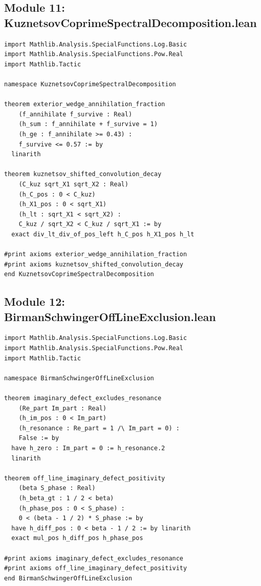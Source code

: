 \documentclass[11pt,a4paper]{article}
\begin{document}
\subsection{Module 11: KuznetsovCoprimeSpectralDecomposition.lean}
\begin{lstlisting}[language=Lean4]
import Mathlib.Analysis.SpecialFunctions.Log.Basic
import Mathlib.Analysis.SpecialFunctions.Pow.Real
import Mathlib.Tactic

namespace KuznetsovCoprimeSpectralDecomposition

theorem exterior_wedge_annihilation_fraction
    (f_annihilate f_survive : Real)
    (h_sum : f_annihilate + f_survive = 1)
    (h_ge : f_annihilate >= 0.43) :
    f_survive <= 0.57 := by
  linarith

theorem kuznetsov_shifted_convolution_decay
    (C_kuz sqrt_X1 sqrt_X2 : Real)
    (h_C_pos : 0 < C_kuz)
    (h_X1_pos : 0 < sqrt_X1)
    (h_lt : sqrt_X1 < sqrt_X2) :
    C_kuz / sqrt_X2 < C_kuz / sqrt_X1 := by
  exact div_lt_div_of_pos_left h_C_pos h_X1_pos h_lt

#print axioms exterior_wedge_annihilation_fraction
#print axioms kuznetsov_shifted_convolution_decay
end KuznetsovCoprimeSpectralDecomposition
\end{lstlisting}

\subsection{Module 12: BirmanSchwingerOffLineExclusion.lean}
\begin{lstlisting}[language=Lean4]
import Mathlib.Analysis.SpecialFunctions.Log.Basic
import Mathlib.Analysis.SpecialFunctions.Pow.Real
import Mathlib.Tactic

namespace BirmanSchwingerOffLineExclusion

theorem imaginary_defect_excludes_resonance
    (Re_part Im_part : Real)
    (h_im_pos : 0 < Im_part)
    (h_resonance : Re_part = 1 /\ Im_part = 0) :
    False := by
  have h_zero : Im_part = 0 := h_resonance.2
  linarith

theorem off_line_imaginary_defect_positivity
    (beta S_phase : Real)
    (h_beta_gt : 1 / 2 < beta)
    (h_phase_pos : 0 < S_phase) :
    0 < (beta - 1 / 2) * S_phase := by
  have h_diff_pos : 0 < beta - 1 / 2 := by linarith
  exact mul_pos h_diff_pos h_phase_pos

#print axioms imaginary_defect_excludes_resonance
#print axioms off_line_imaginary_defect_positivity
end BirmanSchwingerOffLineExclusion
\end{lstlisting}
\end{document}
